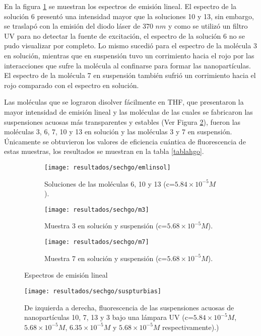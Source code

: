 En la figura \ref{emilinhgo} se muestran los espectros de emisi\'on lineal. El espectro de la soluci\'on 6 present\'o una intensidad mayor que la soluciones 10 y 13, sin embargo, se traslap\'o con la emisi\'on del diodo l\'aser de 370 $nm$ y como se utiliz\'o un filtro UV para no detectar la fuente de excitaci\'on, el espectro de la soluci\'on 6 no se pudo visualizar por completo. Lo mismo sucedi\'o para el espectro de la mol\'ecula 3 en soluci\'on, mientras que en suspensi\'on tuvo un corrimiento hacia el rojo por las interacciones que sufre la mol\'ecula al confinarse para formar las nanopart\'iculas. El espectro de la mol\'ecula 7 en suspensi\'on tambi\'en sufri\'o un corrimiento hacia el rojo comparado con el espectro en soluci\'on.

Las mol\'eculas que se lograron disolver f\'acilmente en THF, que presentaron la mayor intensidad de emisi\'on lineal y las mol\'eculas de las cuales se fabricaron las suspensiones acuosas m\'as transparentes y estables (Ver Figura \ref{susphgo}), fueron las mol\'eculas  3, 6, 7, 10 y 13 en soluci\'on y las mol\'eculas 3 y 7 en suspensi\'on. \'Unicamente se obtuvieron los valores de eficiencia cu\'antica de fluorescencia de estas muestras, los resultados se muestran en la tabla \ref{tablahgo}.  

\begin{figure}[H]
\centering
\begin{subfigure}{\textwidth}
\centering
\texttt{[image: resultados/sechgo/emlinsol]}\caption{Soluciones de las mol\'eculas 6, 10 y 13 (c=$5.84\times 10^{-5} M$).}
\end{subfigure}
\begin{subfigure}{\textwidth}
\centering
\texttt{[image: resultados/sechgo/m3]}\caption{Muestra 3 en soluci\'on y suspensi\'on (c=$5.68\times 10^{-5} M$).}
\end{subfigure}
\begin{subfigure}{\textwidth}
\centering
\texttt{[image: resultados/sechgo/m7]}\caption{Muestra 7 en soluci\'on y suspensi\'on (c=$5.68\times 10^{-5} M$).}
\end{subfigure}
\caption{Espectros de emisi\'on lineal}
\label{emilinhgo}
\end{figure}

\begin{figure}[h]
\centering
\texttt{[image: resultados/sechgo/suspturbias]}
\caption{De izquierda a derecha, fluorescencia de las suspensiones acuosas de nanopart\'iculas 10, 7, 13 y 3 bajo una l\'ampara UV (c=$5.84\times 10^{-5} M$, $5.68\times 10^{-5} M$, $6.35\times 10^{-5} M$ y $5.68\times 10^{-5} M$ respectivamente).)}\label{susphgo}
\end{figure}

